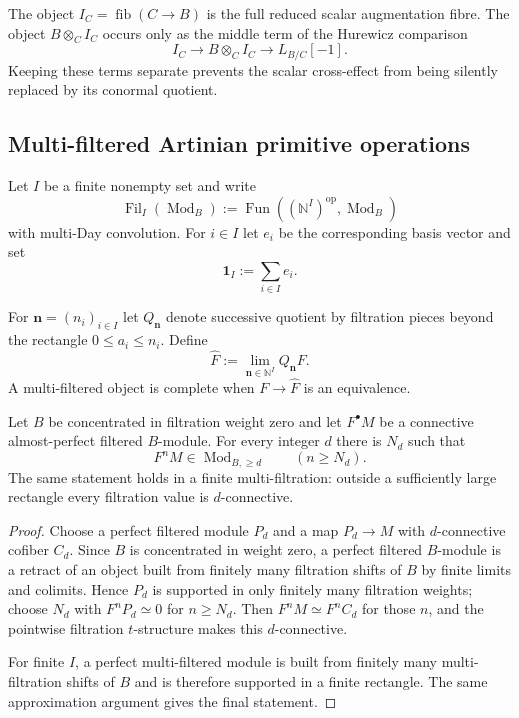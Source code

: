 \begin{remark}
The object $I_C=\operatorname{fib}(C\to B)$ is the full reduced scalar
augmentation fibre.  The object $B\otimes_CI_C$ occurs only as the middle term
of the Hurewicz comparison
\[
    I_C\longrightarrow B\otimes_CI_C\longrightarrow L_{B/C}[-1].
\]
Keeping these terms separate prevents the scalar cross-effect from being
silently replaced by its conormal quotient.
\end{remark}

\subsection{Multi-filtered Artinian primitive operations}

Let $I$ be a finite nonempty set and write
\[
    \operatorname{Fil}_I(\operatorname{Mod}_B)
    :=
    \operatorname{Fun}
    ((\mathbb N^I)^{\mathrm{op}},\operatorname{Mod}_B)
\]
with multi-Day convolution.  For $i\in I$ let $e_i$ be the corresponding basis
vector and set
\[
    \mathbf1_I:=\sum_{i\in I}e_i.
\]

\begin{definition}
\label{def:as-multi-completion}
For $\mathbf n=(n_i)_{i\in I}$ let $Q_{\mathbf n}$ denote successive quotient
by filtration pieces beyond the rectangle $0\leq a_i\leq n_i$.  Define
\[
\boxed{
    \widehat F
    :=
    \lim_{\mathbf n\in\mathbb N^I}Q_{\mathbf n}F.
}
\]
A multi-filtered object is complete when $F\to\widehat F$ is an equivalence.
\end{definition}

\begin{lemma}
\label{lem:as-aperf-tail-connectivity}
Let $B$ be concentrated in filtration weight zero and let $F^\bullet M$ be a
connective almost-perfect filtered $B$-module.  For every integer $d$ there is
$N_d$ such that
\[
\boxed{
    F^nM\in\operatorname{Mod}_{B,\geq d}
    \qquad
    (n\geq N_d).
}
\]
The same statement holds in a finite multi-filtration: outside a sufficiently
large rectangle every filtration value is $d$-connective.
\end{lemma}

\begin{proof}
Choose a perfect filtered module $P_d$ and a map $P_d\to M$ with
$d$-connective cofiber $C_d$.  Since $B$ is concentrated in weight zero, a
perfect filtered $B$-module is a retract of an object built from finitely many
filtration shifts of $B$ by finite limits and colimits.  Hence $P_d$ is
supported in only finitely many filtration weights; choose $N_d$ with
$F^nP_d\simeq0$ for $n\geq N_d$.  Then $F^nM\simeq F^nC_d$ for those $n$,
and the pointwise filtration $t$-structure makes this $d$-connective.

For finite $I$, a perfect multi-filtered module is built from finitely many
multi-filtration shifts of $B$ and is therefore supported in a finite
rectangle.  The same approximation argument gives the final statement.
\end{proof}

